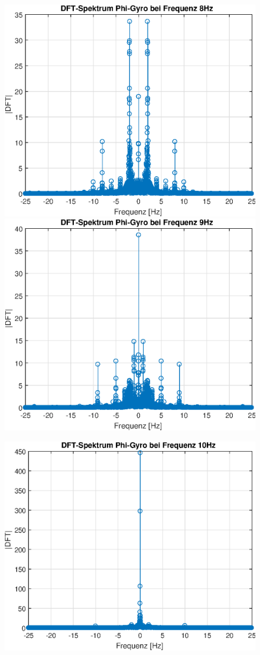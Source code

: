 \documentclass{article}
\begin{document}
\begin{figure}[h!]
\includegraphics[width=0.5\linewidth]{img/dft_phi_g_9}
\includegraphics[width=0.5\linewidth]{img/dft_phi_g_10}
\end{figure}
\begin{figure}[h!]
\centering
\includegraphics[width=0.5\linewidth]{img/dft_phi_g_11}
\end{figure}

\newpage
\end{document}
